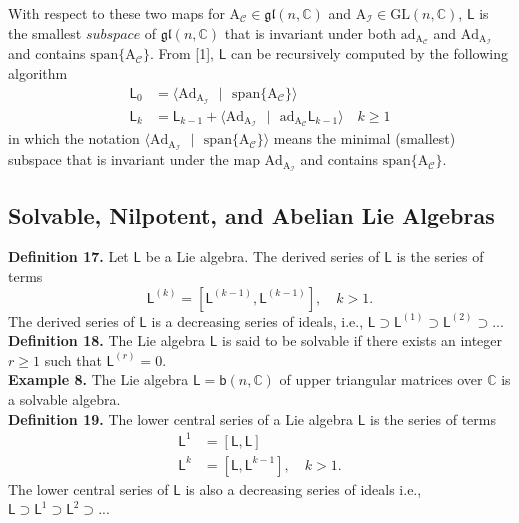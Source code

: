 \documentclass[11pt,a4paper]{article}
\begin{document}
With respect to these two maps for
$\mathrm{A}_\mathcal{C} \in \mathfrak{gl}(n,\mathbb{C})$ and $\mathrm{A}_\mathcal{I} \in \mathrm{GL}(n,\mathbb{C})$,
$\mathsf{L}$ is the smallest $subspace$ of $\mathfrak{gl}(n,\mathbb{C})$ that is invariant under both $\mathrm{ad}_{\mathrm{A}_\mathcal{C}}$ and $\mathrm{Ad}_{\mathrm{A}_{\mathcal{I}}}$ and contains $\mathrm{span}\{\mathrm{A}_\mathcal{C}\}$. From [1], $\mathsf{L}$ can be recursively computed by the following algorithm
\begin{align*}
\mathsf{L}_0 &= \langle \mathrm{Ad}_{\mathrm{A}_{\mathcal{I}}} \text{ }| \text{ } \mathrm{span}\{\mathrm{A}_\mathcal{C}\} \rangle \\
\mathsf{L}_k &= \mathsf{L}_{k-1} + \langle \mathrm{Ad}_{\mathrm{A}_{\mathcal{I}}} \text{ }| \text{ } \mathrm{ad}_{\mathrm{A}_\mathcal{C}}\mathsf{L}_{k-1} \rangle \quad k \geq 1
\end{align*}
in which the notation $\langle \mathrm{Ad}_{\mathrm{A}_{\mathcal{I}}} \text{ }| \text{ } \mathrm{span}\{\mathrm{A}_\mathcal{C}\} \rangle$ means the minimal (smallest) subspace that is invariant under the map $\mathrm{Ad}_{\mathrm{A}_{\mathcal{I}}}$ and contains
$\mathrm{span}\{\mathrm{A}_\mathcal{C}\}$.

%
\subsection{Solvable, Nilpotent, and Abelian Lie Algebras}
\quad \textbf{ Definition 17.} Let $\mathsf{L}$ be a Lie algebra. The derived series of $\mathsf{L}$ is the series of terms
$$
\mathsf{L}^{(k)} = [\mathsf{L}^{(k-1)},\mathsf{L}^{(k-1)}], \quad k > 1.
$$
The derived series of $\mathsf{L}$ is a decreasing series of ideals, i.e., $\mathsf{L} \supset \mathsf{L}^{(1)} \supset \mathsf{L}^{(2)} \supset ... $\\

\textbf{Definition 18.} The Lie algebra $\mathsf{L}$ is said to be solvable if there exists an integer $r \geq 1$ such that $\mathsf{L}^{(r)} = 0$.\\

\textbf{Example 8.} The Lie algebra $\mathsf{L} = \mathsf{b}(n,\mathbb{C})$ of upper triangular matrices over $\mathbb{C}$ is a solvable algebra.\\

\textbf{Definition 19.} The lower central series of a Lie algebra $\mathsf{L}$ is the series of terms
\begin{align*}
\mathsf{L}^1   &= [\mathsf{L},\mathsf{L}] \\
\mathsf{L}^{k} &= [\mathsf{L},\mathsf{L}^{k-1}], \quad k > 1.
\end{align*}
The lower central series of $\mathsf{L}$ is also a decreasing series of ideals i.e., $\mathsf{L} \supset \mathsf{L}^{1} \supset \mathsf{L}^{2} \supset ... $\\
\end{document}
